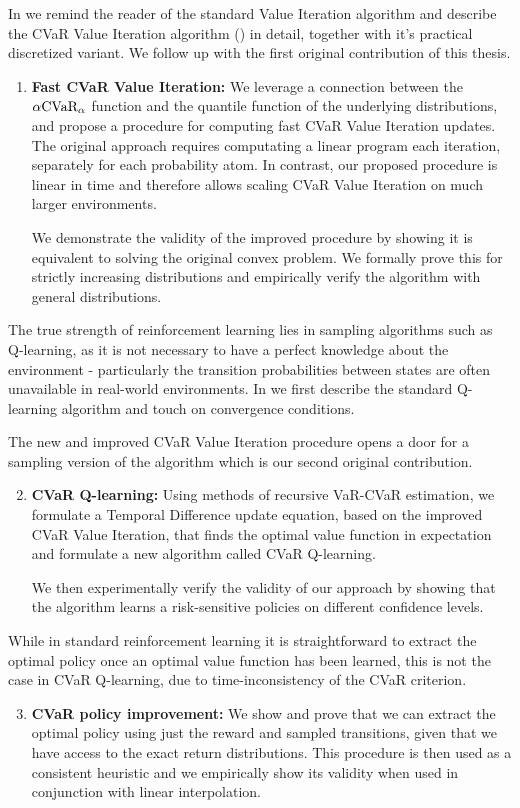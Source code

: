 In  we remind the reader of the standard Value Iteration algorithm and describe the CVaR Value Iteration algorithm (\citet{chow2015risk}) in detail, together with it's practical discretized variant. We follow up with the first original contribution of this thesis.
\begin{enumerate}
\item \textbf{Fast CVaR Value Iteration:} We leverage a connection between the $\alpha\text{CVaR}_\alpha$ function and the quantile function of the underlying distributions, and propose a procedure for computing fast CVaR Value Iteration updates. The original approach requires computating a linear program each iteration, separately for each probability atom. In contrast, our proposed procedure is linear in time and therefore allows scaling CVaR Value Iteration on much larger environments.

We demonstrate the validity of the improved procedure by showing it is equivalent to solving the original convex problem. We formally prove this for strictly increasing distributions and empirically verify the algorithm with general distributions.
\end{enumerate}

The true strength of reinforcement learning lies in sampling algorithms such as Q-learning, as it is not necessary to have a perfect knowledge about the environment - particularly the transition probabilities between states are often unavailable in real-world environments. In  we first describe the standard Q-learning algorithm and touch on convergence conditions. 

The new and improved CVaR Value Iteration procedure opens a door for a sampling version of the algorithm which is our second original contribution.
\begin{enumerate}
\setcounter{enumi}{1}
\item \textbf{CVaR Q-learning:} Using methods of recursive VaR-CVaR estimation, we formulate a Temporal Difference update equation, based on the improved CVaR Value Iteration, that finds the optimal value function in expectation and formulate a new algorithm called CVaR Q-learning. 

We then experimentally verify the validity of our approach by showing that the algorithm learns a risk-sensitive policies on different confidence levels.
\end{enumerate}

While in standard reinforcement learning it is straightforward to extract the optimal policy once an optimal value function has been learned, this is not the case in CVaR Q-learning, due to time-inconsistency of the CVaR criterion.
\begin{enumerate}
\setcounter{enumi}{2}
\item \textbf{CVaR policy improvement:} We show and prove that we can extract the optimal policy using just the reward and sampled transitions, given that we have access to the exact return distributions. This procedure is then used as a consistent heuristic and we empirically show its validity when used in conjunction with linear interpolation. 
\end{enumerate}

